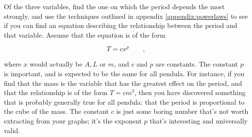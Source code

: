Of the three variables, find the one on which the period
depends the most strongly, and use the techniques outlined
in appendix \ref{appendix:powerlaws} to see if you can find an equation
describing the relationship between the period and that
variable.  Assume that the equation is of the form

\begin{equation*}
      T  =  cx^p   \qquad   ,  
\end{equation*}

where $x$ would actually be $A,L$ or $m$, and $c$ and $p$
are constants.  The constant $p$ is important, and is
expected to be the same for all pendula.  For instance, if
you find that the mass is the variable that has the greatest
effect on the period, and that the relationship is of the
form $T=cm^3$, then you have discovered something that is
probably generally true for all pendula: that the period is
proportional to the cube of the mass. The constant $c$ is
just some boring number that's not worth extracting from your graphs;
it's the exponent $p$ that's interesting and universally valid.

